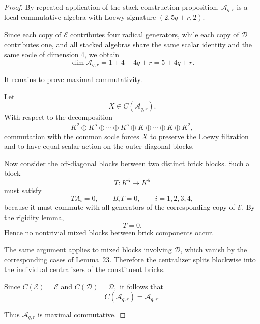 \documentclass[10pt,a4paper]{amsart}
\begin{document}
\begin{proof}
	By repeated application of the stack construction proposition,
	$\mathcal A_{q,r}$
	is a local commutative algebra with Loewy signature $(2,5q+r,2).$
	
	Since each copy of \(\mathcal E\) contributes four radical generators,
	while each copy of \(\mathcal D\) contributes one, and all stacked
	algebras share the same scalar identity and the same socle of dimension
	\(4\), we obtain
	\[
	\dim \mathcal A_{q,r}=1+4+4q+r=5+4q+r.
	\]
	
	It remains to prove maximal commutativity.
	
	Let
	\[
	X\in C(\mathcal A_{q,r}).
	\]
	With respect to the decomposition
	\[
	K^2
	\oplus
	K^5
	\oplus\cdots\oplus
	K^5
	\oplus
	K
	\oplus\cdots\oplus
	K
	\oplus
	K^2,
	\]
	commutation with the common socle forces \(X\) to preserve the Loewy
	filtration and to have equal scalar action on the outer diagonal blocks.
	
	Now consider the off-diagonal blocks between two distinct brick blocks.
	Such a block
	\[
	T:K^5\to K^5
	\]
	must satisfy
	\[
	TA_i=0,
	\qquad
	B_iT=0,
	\qquad i=1,2,3,4,
	\]
	because it must commute with all generators of the corresponding copy of
	\(\mathcal E\).
	By the rigidity lemma,
	\[
	T=0.
	\]
	Hence no nontrivial mixed blocks between brick components occur.
	
The same argument applies to mixed blocks involving \(\mathcal D\), which vanish
by the corresponding cases of Lemma~23. Therefore the centralizer splits
blockwise into the individual centralizers of the constituent bricks.
	
	Since $	C(\mathcal E)=\mathcal E$
	and $C(\mathcal D)=\mathcal D,$
	it follows that
	\[
	C(\mathcal A_{q,r})=\mathcal A_{q,r}.
	\]
	
	Thus $\mathcal A_{q,r}$
	is maximal commutative.
\end{proof}
\end{document}
